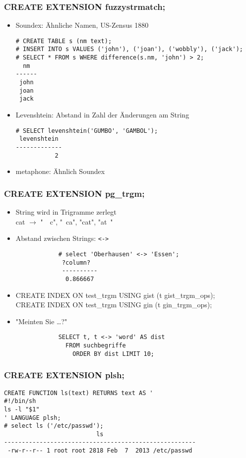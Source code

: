\documentclass[utf8,hyperref={pdftex,colorlinks,linkcolor=black,citecolor=black,urlcolor=black,filecolor=black,plainpages=false},xcolor=table,hyperref]{beamer}
\begin{document}
\begin{frame}[containsverbatim]
	\frametitle{CREATE EXTENSION fuzzystrmatch;}
	\begin{itemize}
		\item Soundex: Ähnliche Namen, US-Zensus 1880
			{\footnotesize
		\begin{verbatim}
# CREATE TABLE s (nm text);
# INSERT INTO s VALUES ('john'), ('joan'), ('wobbly'), ('jack');
# SELECT * FROM s WHERE difference(s.nm, 'john') > 2;
  nm  
------
 john
 joan
 jack
			  \end{verbatim}}
		  \item Levenshtein: Abstand in Zahl der Änderungen am String
			  {\footnotesize
			  \begin{verbatim}
# SELECT levenshtein('GUMBO', 'GAMBOL');
 levenshtein
-------------
           2
	   \end{verbatim}}
   \item metaphone: Ähnlich Soundex
	  \end{itemize}

\end{frame}

\begin{frame}[containsverbatim]
	\frametitle{CREATE EXTENSION pg_trgm;}
	\begin{itemize}
		\item String wird in Trigramme zerlegt \\
			cat $\rightarrow$ "\ \ c", "\ ca", "cat", "{}at\ "
		\item Abstand zwischen Strings: \verb|<->|
			\begin{verbatim}
			# select 'Oberhausen' <-> 'Essen';
			 ?column? 
			 ----------
			  0.866667
			  \end{verbatim}
		  \item CREATE INDEX ON test_trgm USING gist (t gist_trgm_ops); \\
			CREATE INDEX ON test_trgm USING gin (t gin_trgm_ops);
		\item "Meinten Sie \dots?"\begin{verbatim}
			SELECT t, t <-> 'word' AS dist
			  FROM suchbegriffe
			    ORDER BY dist LIMIT 10;
			    \end{verbatim}
		    
	\end{itemize}
\end{frame}

\begin{frame}[containsverbatim]
	\frametitle{CREATE EXTENSION plsh;}
	\begin{verbatim}
CREATE FUNCTION ls(text) RETURNS text AS '
#!/bin/sh
ls -l "$1"
' LANGUAGE plsh;
# select ls ('/etc/passwd');
                          ls                          
------------------------------------------------------
 -rw-r--r-- 1 root root 2818 Feb  7  2013 /etc/passwd
\end{verbatim}
\end{frame}
\end{document}
